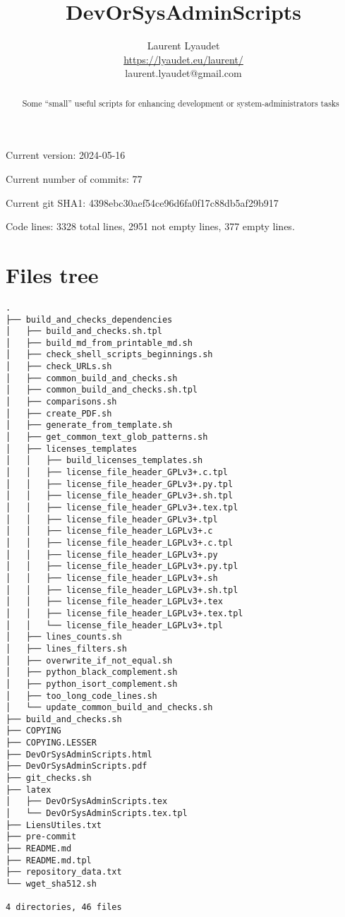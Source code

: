 \documentclass{article}
\begin{document}
\author{
  Laurent Lyaudet\\
  \url{https://lyaudet.eu/laurent/}\\
  laurent.lyaudet@gmail.com
}
\title{DevOrSysAdminScripts}

\maketitle
\begin{abstract}
Some ``small'' useful scripts
for enhancing development or system-administrators tasks
\end{abstract}

Current version: 2024-05-16

Current number of commits: 77

Current git SHA1: 4398ebc30aef54ce96d6fa0f17c88db5af29b917

Code lines: 3328 total lines, 2951 not empty lines, 377 empty lines.

\section{Files tree}
\label{section:tree}

\begin{verbatim}
.
├── build_and_checks_dependencies
│   ├── build_and_checks.sh.tpl
│   ├── build_md_from_printable_md.sh
│   ├── check_shell_scripts_beginnings.sh
│   ├── check_URLs.sh
│   ├── common_build_and_checks.sh
│   ├── common_build_and_checks.sh.tpl
│   ├── comparisons.sh
│   ├── create_PDF.sh
│   ├── generate_from_template.sh
│   ├── get_common_text_glob_patterns.sh
│   ├── licenses_templates
│   │   ├── build_licenses_templates.sh
│   │   ├── license_file_header_GPLv3+.c.tpl
│   │   ├── license_file_header_GPLv3+.py.tpl
│   │   ├── license_file_header_GPLv3+.sh.tpl
│   │   ├── license_file_header_GPLv3+.tex.tpl
│   │   ├── license_file_header_GPLv3+.tpl
│   │   ├── license_file_header_LGPLv3+.c
│   │   ├── license_file_header_LGPLv3+.c.tpl
│   │   ├── license_file_header_LGPLv3+.py
│   │   ├── license_file_header_LGPLv3+.py.tpl
│   │   ├── license_file_header_LGPLv3+.sh
│   │   ├── license_file_header_LGPLv3+.sh.tpl
│   │   ├── license_file_header_LGPLv3+.tex
│   │   ├── license_file_header_LGPLv3+.tex.tpl
│   │   └── license_file_header_LGPLv3+.tpl
│   ├── lines_counts.sh
│   ├── lines_filters.sh
│   ├── overwrite_if_not_equal.sh
│   ├── python_black_complement.sh
│   ├── python_isort_complement.sh
│   ├── too_long_code_lines.sh
│   └── update_common_build_and_checks.sh
├── build_and_checks.sh
├── COPYING
├── COPYING.LESSER
├── DevOrSysAdminScripts.html
├── DevOrSysAdminScripts.pdf
├── git_checks.sh
├── latex
│   ├── DevOrSysAdminScripts.tex
│   └── DevOrSysAdminScripts.tex.tpl
├── LiensUtiles.txt
├── pre-commit
├── README.md
├── README.md.tpl
├── repository_data.txt
└── wget_sha512.sh

4 directories, 46 files
\end{verbatim}
\end{document}
